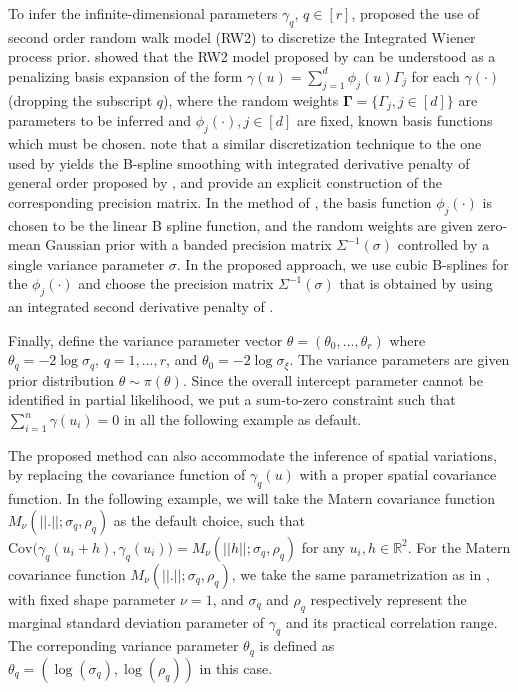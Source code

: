 \documentclass[ba]{imsart}
\begin{document}
To infer the infinite-dimensional parameters $\gamma_q$, $q \in [r]$, \cite{rw2} proposed the use of second order random walk model (RW2) to discretize the Integrated Wiener process prior. \cite{SPDEandPspline} showed that the RW2 model proposed by \cite{rw2} can be understood as a penalizing basis expansion of the form $\gamma(u) = \sum_{j=1}^{d}\phi_{j}(u)\Gamma_{j}$ for each $\gamma(\cdot)$ (dropping the subscript $q$), where the random weights $\boldsymbol{\Gamma} = \{\Gamma_{j},j\in[d]\}$ are parameters to be inferred and $\phi_{j}(\cdot),j\in[d]$ are fixed, known basis functions which must be chosen. 
\cite{adaptivesmoothingsplines} note that a similar discretization technique to the one used by \cite{rw2} yields the B-spline smoothing with integrated derivative penalty of general order proposed by \cite{osullivanspline}, and \cite{derivativepenalties} provide an explicit construction of the corresponding precision matrix.
In the method of \cite{rw2}, the basis function $\phi_{j}(\cdot)$ is chosen to be the linear B spline function, and the random weights are given zero-mean Gaussian prior with a banded precision matrix $\Sigma^{-1}(\sigma)$ controlled by a single variance parameter $\sigma$.
In the proposed approach, we use cubic B-splines for the $\phi_{j}(\cdot)$ and choose the precision matrix $\Sigma^{-1}(\sigma)$ that is obtained by using an integrated second derivative penalty of \cite{derivativepenalties}.

Finally, define the variance parameter vector $\theta = (\theta_{0},\ldots,\theta_{r})$ where $\theta_{q} = -2\log\sigma_{q}$, $q = 1,\ldots,r$, and $\theta_{0} = -2\log\sigma_{\xi}$. The variance parameters are given prior distribution $\theta \sim \pi(\theta)$. Since the overall intercept parameter cannot be identified in partial likelihood, we put a sum-to-zero constraint such that $\sum_{i=1}^{n} \gamma{(u_i)} = 0$ in all the following example as default.

The proposed method can also accommodate the inference of spatial variations, by replacing the covariance function of $\gamma_q(u)$ with a proper spatial covariance function. In the following example, we will take the Matern covariance function $M_\nu(||.||;\sigma_q,\rho_q)$ as the default choice, such that $\text{Cov}\big(\gamma_q(u_i+h),\gamma_q(u_i)\big) = M_\nu(||h||;\sigma_q,\rho_q)$ for any $u_i, h \in \mathbb{R}^2$. For the Matern covariance function $M_\nu(||.||;\sigma_q,\rho_q)$, we take the same parametrization as in \cite{brown2015model}, with fixed shape parameter $\nu = 1$, and $\sigma_q$ and $\rho_q$ respectively represent the marginal standard deviation parameter of $\gamma_q$ and its practical correlation range. The correponding variance parameter $\theta_q$ is defined as $\theta_q = (\log(\sigma_q), \log(\rho_q))$ in this case.
\end{document}
